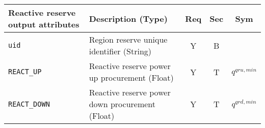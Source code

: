 \documentclass{article}
\newcounter{todo}[section] \setcounter{todo}{0}
\renewcommand{\thetodo}{\arabic{section}.\arabic{todo}}
\newenvironment{todo}[2][]{%
\refstepcounter{todo}%
\ifstrempty{#1}%
{\mdfsetup{%
frametitle={%
\tikz[baseline=(current bounding box.east),outer sep=0pt]
\node[anchor=east,rectangle,fill=red!20]
{\strut To Be Discussed~\thetodo};}}
}%
{\mdfsetup{%
frametitle={%
\tikz[baseline=(current bounding box.east),outer sep=0pt]
\node[anchor=east,rectangle,fill=red!20]
{\strut To Be Discussed~\thetodo:~#1};}}%
}%
\mdfsetup{innertopmargin=10pt,linecolor=red!20,%
linewidth=2pt,topline=true,%
frametitleaboveskip=\dimexpr-\ht\strutbox\relax
}
\begin{mdframed}[]\relax%
\label{#2}}{\end{mdframed}}
\begin{document}
\begin{center}
\small
\begin{tabular}{ l | l | c | c | c |}
Reactive reserve output attributes & Description (Type) & Req & Sec & Sym\\
\hline
  {\tt uid} & Region reserve unique identifier (String) & Y & B & \\
  {\tt REACT\_UP} & Reactive reserve power up procurement (Float) & Y & T & $q^{qru,min}$ \\
  {\tt REACT\_DOWN} & Reactive reserve power down procurement (Float) & Y & T & $q^{qrd,min}$ \\
  \hline
\end{tabular}
\end{center}    


\end{document}
